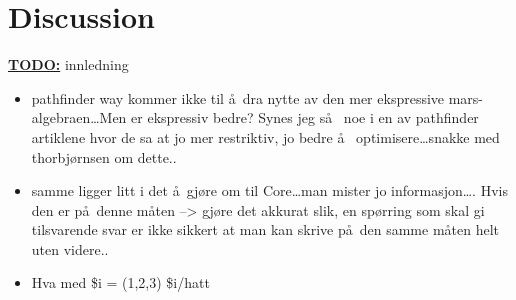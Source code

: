 \chapter{Discussion}
\label{chapter:discussion}

\textbf{\underline{\LARGE TODO:}} innledning

\begin{itemize}
  \item pathfinder way kommer ikke til \aa~dra nytte av den mer ekspressive
  mars-algebraen\ldots Men er ekspressiv bedre? Synes jeg s\aa~ noe i en av
  pathfinder artiklene hvor de sa at jo mer restriktiv, jo bedre \aa~
  optimisere\ldots snakke med thorbj\o rnsen om dette..
  \item samme ligger litt i det \aa~gj\o re om til Core\ldots man mister jo
  informasjon\ldots. Hvis den er p\aa~denne m\aa ten --> gj\o re det akkurat
  slik, en sp\o rring som skal gi tilsvarende svar er ikke sikkert at man kan
  skrive p\aa~den samme m\aa ten helt uten videre..

	\item Hva med \$i = (1,2,3) \$i/hatt
\end{itemize}







